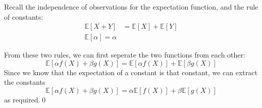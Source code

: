 Recall the independence of observations for the expectation function, and the rule of constants:
\begin{align*}
  \mathbb{E}[X + Y] &= \mathbb{E}[X] + \mathbb{E}[Y]\\
  \mathbb{E}[\alpha] = \alpha
\end{align*}

From these two rules, we can first seperate the two functions from each other:
\begin{equation*}
  \mathbb{E}[\alpha f(X) + \beta g(X)] = \mathbb{E}[\alpha f(X)] + \mathbb{E}[\beta g(X)]
\end{equation*}
Since we know that the expectation of a constant is that constant, we can extract the constants
\begin{equation*}
    \mathbb{E}[\alpha f(X) + \beta g(X)] = \alpha\mathbb{E}[f(X)] + \beta\mathbb{E}[g(X)]
\end{equation*}
as required.\qed
